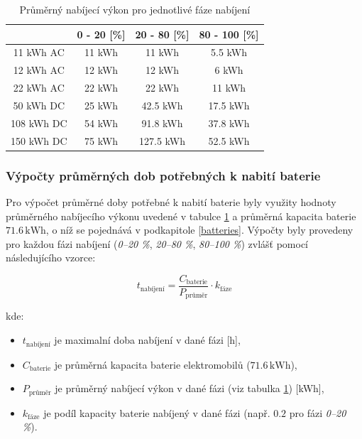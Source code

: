 \documentclass[a4paper,11pt]{article}
\begin{document}
\begin{table}[H]
    \centering 
    \vspace{0.5cm} %
    \begin{tabular}{|c|c|c|c|}
        \hline
        \textbf{} & \textbf{0 - 20 [\%]} & \textbf{20 - 80 [\%]} & \textbf{80 - 100 [\%]}\\
        \hline
        11 kWh AC  &  11 kWh  & 11 kWh & 5.5 kWh     \\
        \hline
        12 kWh AC  &  12 kWh  & 12 kWh & 6 kWh     \\
        \hline
        22 kWh AC  &  22 kWh  & 22 kWh & 11 kWh  \\
        \hline
        50 kWh DC  &  25 kWh  & 42.5 kWh & 17.5 kWh    \\
        \hline
        108 kWh DC &  54 kWh  & 91.8 kWh & 37.8 kWh \\
        \hline
        150 kWh DC &  75 kWh  & 127.5 kWh & 52.5 kWh \\
        \hline
    \end{tabular}
    \caption{Průměrný nabíjecí výkon pro jednotlivé fáze nabíjení}
    \label{table:average-charging-power}
    \vspace{0.5cm} %
\end{table}


\subsubsection{Výpočty průměrných dob potřebných k nabití baterie}

Pro výpočet průměrné doby potřebné k nabití baterie byly využity hodnoty průměrného nabíjecího výkonu uvedené v tabulce \ref{table:average-charging-power} a průměrná kapacita baterie \(71.6 \, \mathrm{kWh}\), o níž se pojednává v podkapitole \ref{batteries}. Výpočty byly provedeny pro každou fázi nabíjení (\textit{0–20 \%}, \textit{20–80 \%}, \textit{80–100 \%}) zvlášť pomocí následujícího vzorce:

\[
t_{\text{nabíjení}} = \frac{C_{\text{baterie}}}{P_{\text{průměr}}} \cdot k_{\text{fáze}}
\]

kde:
\begin{itemize}
    \item \(t_{\text{nabíjení}}\) je maximalní doba nabíjení v dané fázi [h],
    \item \(C_{\text{baterie}}\) je průměrná kapacita baterie elektromobilů (\(71.6 \, \mathrm{kWh}\)),
    \item \(P_{\text{průměr}}\) je průměrný nabíjecí výkon v dané fázi (viz tabulka \ref{table:average-charging-power}) [kWh],
    \item \(k_{\text{fáze}}\) je podíl kapacity baterie nabíjený v dané fázi (např. \(0.2\) pro fázi \textit{0–20 \%}).\\
\end{itemize}
\end{document}
